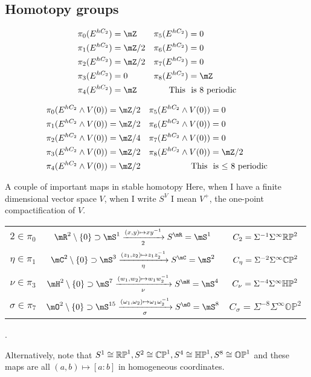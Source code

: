 \newpage
\subsection{Homotopy groups}
\begin{fact}{}{}
  \begin{align*}
    \pi_0(E^{hC_2})&= \mZ & \pi_5(E^{hC_2})&= 0\\
    \pi_1(E^{hC_2})&= \mZ/2 & \pi_6(E^{hC_2})&=0\\
    \pi_2(E^{hC_2})&= \mZ/2 & \pi_7(E^{hC_2})&=0\\
    \pi_3(E^{hC_2})&= 0 & \pi_8(E^{hC_2})&=\mZ\\
    \pi_4(E^{hC_2})&= \mZ & \text{This }&\text{  is 8 periodic}
  \end{align*}
\end{fact}
\begin{fact}{}{}
  \begin{align*}
    \pi_0(E^{hC_2}\wedge V(0))&= \mZ/2 & \pi_5(E^{hC_2}\wedge V(0))&= 0\\
    \pi_1(E^{hC_2}\wedge V(0))&= \mZ/2 & \pi_6(E^{hC_2}\wedge V(0))&=0\\
    \pi_2(E^{hC_2}\wedge V(0))&= \mZ/4 & \pi_7(E^{hC_2}\wedge V(0))&=0\\
    \pi_3(E^{hC_2}\wedge V(0))&= \mZ/2 & \pi_8(E^{hC_2}\wedge V(0))&=\mZ/2\\
    \pi_4(E^{hC_2}\wedge V(0))&= \mZ/2 & \text{This }&\text{  is $\leq$ 8 periodic}
  \end{align*}
\end{fact}
\begin{fact}{A couple of important maps in stable homotopy}{}
  Here, when I have a finite dimensional vector space $V$, when I write $S^V$ I mean $V^+$, the one-point compactification of $V$.
  \begin{center}
    \begin{tabular}{ccc}
      $2\in \pi_0$ &$\mR^2\setminus \sets{0} \supset \mS^1\xrightarrow[2]{(x,y)\mapsto xy\inv}S^{\mR} = \mS^1$ & $C_2 = \Sigma^{-1}\Sigma^\infty \mathbb{RP}^2$\\
      $\eta\in\pi_1$ & $\mC^2\setminus \sets{0} \supset \mS^3\xrightarrow[\eta]{(z_1,z_2)\mapsto z_1z_2\inv}S^{\mC} = \mS^2$ & $C_\eta = \Sigma^{-2}\Sigma^\infty \mathbb{CP}^2$\\
      $\nu\in\pi_3$ & $\mH^2\setminus \sets{0} \supset \mS^7\xrightarrow[\nu]{(w_1,w_2)\mapsto w_1w_2\inv}S^{\mH} = \mS^4$ & $C_\nu = \Sigma^{-4}\Sigma^\infty \mathbb{HP}^2$\\
      $\sigma\in\pi_7$ & $\mO^2\setminus \sets{0} \supset \mS^{15}\xrightarrow[\sigma]{(\omega_1,\omega_2)\mapsto \omega_1\omega_2\inv}S^{\mO} = \mS^8$ & $C_\sigma = \Sigma^{-8}\Sigma^\infty \mathbb{OP}^2$\\
    \end{tabular}.
  \end{center}
  Alternatively, note that $S^1\cong \mathbb{RP}^1, S^2\cong \mathbb{CP}^1, S^4 \cong \mathbb{HP}^1, S^8\cong \mathbb{OP}^1$ and these maps are all $(a,b)\mapsto [a:b]$ in homogeneous coordinates. 
\end{fact}

